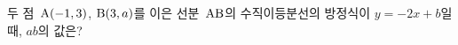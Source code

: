 두 점~$\mathrm{A}(-1{,}\mkern3mu\mathopen{}3)$, $\mathrm{B}(3{,}\mkern3mu\mathopen{}a)$를 이은 선분~$\mathrm{AB}$의 수직이등분선의 방정식이 $y=-2x+b$일 때, $ab$의 값은? 
